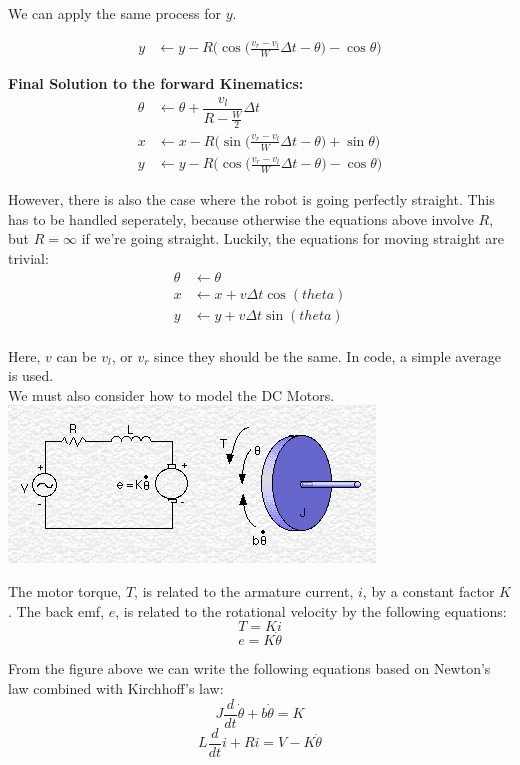 \documentclass{article}
\begin{document}
We can apply the same process for $y$.

\begin{align}
  y &\leftarrow y-R\Bigg(\cos{\Big(\frac{v_r-v_l}{W}\Delta t-\theta\Big)}-\cos{\theta}\Bigg)
\end{align}

\textbf{Final Solution to the forward Kinematics:}
\begin{align}
 \theta &\leftarrow \theta + \dfrac{v_l}{R-\frac{W}{2}}\Delta t \\
  x &\leftarrow x-R\Bigg(\sin{\Big(\frac{v_r-v_l}{W}\Delta t-\theta\Big)}+\sin{\theta}\Bigg) \\
  y &\leftarrow y-R\Bigg(\cos{\Big(\frac{v_r-v_l}{W}\Delta t-\theta\Big)}-\cos{\theta}\Bigg)
\end{align}

However, there is also the case where the robot is going perfectly straight. This has to be handled seperately, because otherwise the equations above involve $R$, but $R=\infty$ if we're going straight. Luckily, the equations for moving straight are trivial:
\begin{align}
 \theta &\leftarrow \theta \\
  x &\leftarrow x + v\Delta t\cos(theta) \\
  y &\leftarrow y + v\Delta t\sin(theta) \\
\end{align}

Here, $v$ can be $v_l$, or $v_r$ since they should be the same. In code, a simple average is used. \\

We must also consider how to model the DC Motors. \\

\includegraphics[scale=0.5]{./dc_motor_model.png}

The motor torque, $T$, is related to the armature current, $i$, by a constant factor $K$. The back emf, $e$, is related to the rotational velocity by the following equations:
$$T=Ki$$
$$e=K\dot{\theta}$$

From the figure above we can write the following equations based on Newton's law combined with Kirchhoff's law:
$$J\frac{d}{dt}\dot{\theta} + b\dot{\theta} = K$$
$$L\frac{d}{dt}i+Ri=V-K\dot{\theta}$$
\end{document}
